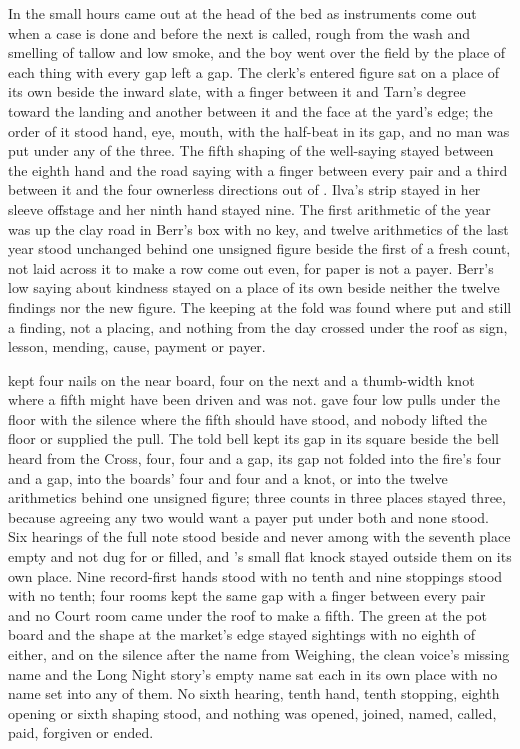 In the small hours  came out at the head of the bed as instruments come out when a case is done and before the next is called, rough from the wash and smelling of tallow and low smoke, and the boy went over the field by the place of each thing with every gap left a gap. The clerk's entered figure sat on a place of its own beside the inward slate, with a finger between it and Tarn's degree toward the landing and another between it and the face at the yard's edge; the order of it stood hand, eye, mouth, with the half-beat in its gap, and no man was put under any of the three. The fifth shaping of the well-saying stayed between the eighth hand and the road saying with a finger between every pair and a third between it and the four ownerless directions out of . Ilva's strip stayed in her sleeve offstage and her ninth hand stayed nine. The first arithmetic of the year was up the clay road in Berr's box with no key, and twelve arithmetics of the last year stood unchanged behind one unsigned figure beside the first of a fresh count, not laid across it to make a row come out even, for paper is not a payer. Berr's low saying about kindness stayed on a place of its own beside neither the twelve findings nor the new figure. The keeping at the fold was found where put and still a finding, not a placing, and nothing from the day crossed under the roof as sign, lesson, mending, cause, payment or payer.

 kept four nails on the near board, four on the next and a thumb-width knot where a fifth might have been driven and was not.  gave four low pulls under the floor with the silence where the fifth should have stood, and nobody lifted the floor or supplied the pull. The told bell kept its gap in its square beside the bell heard from the Cross, four, four and a gap, its gap not folded into the fire's four and a gap, into the boards' four and four and a knot, or into the twelve arithmetics behind one unsigned figure; three counts in three places stayed three, because agreeing any two would want a payer put under both and none stood. Six hearings of the full note stood beside and never among with the seventh place empty and not dug for or filled, and 's small flat knock stayed outside them on its own place. Nine record-first hands stood with no tenth and nine stoppings stood with no tenth; four rooms kept the same gap with a finger between every pair and no Court room came under the roof to make a fifth. The green at the pot board and the shape at the market's edge stayed sightings with no eighth of either, and on  the silence after the name from Weighing, the clean voice's missing name and the Long Night story's empty name sat each in its own place with no name set into any of them. No sixth hearing, tenth hand, tenth stopping, eighth opening or sixth shaping stood, and nothing was opened, joined, named, called, paid, forgiven or ended.

